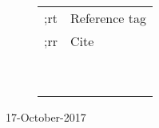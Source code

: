 \documentclass{article}
\begin{document}
\begin{figure}[H]
\begin{minipage}{0.48\textwidth}
\begin{table}[H]
\begin{tabular}{l l}
				;rt	& Reference tag \\
				;rr	& Cite \\
				&  \\
				&  \\
				&  \\
				&  \\
				&  \\
				&  \\
				&  \\
				&  \\
				&  \\
	\end{tabular}
	\label{table:none}
\end{table}

	\end{minipage}
\end{figure}
\vfill
17-October-2017
\end{document}
